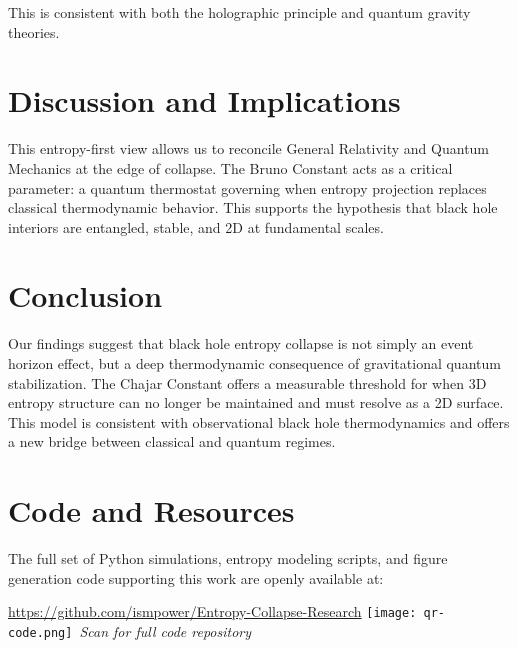 \documentclass[12pt]{article}
\begin{document}
This is consistent with both the holographic principle and quantum gravity theories.

\section{Discussion and Implications}
This entropy-first view allows us to reconcile General Relativity and Quantum Mechanics at the edge of collapse. The Bruno Constant acts as a critical parameter: a quantum thermostat governing when entropy projection replaces classical thermodynamic behavior. This supports the hypothesis that black hole interiors are entangled, stable, and 2D at fundamental scales.

\section{Conclusion}

Our findings suggest that black hole entropy collapse is not simply an event horizon effect, but a deep thermodynamic consequence of gravitational quantum stabilization. The Chajar Constant offers a measurable threshold for when 3D entropy structure can no longer be maintained and must resolve as a 2D surface. This model is consistent with observational black hole thermodynamics and offers a new bridge between classical and quantum regimes.

\section*{Code and Resources}

The full set of Python simulations, entropy modeling scripts, and figure generation code supporting this work are openly available at:
\begin{center}
\url{https://github.com/ismpower/Entropy-Collapse-Research}
\texttt{[image: qr-code.png]}\
\textit{Scan for full code repository}\
\end{center}
\end{document}
